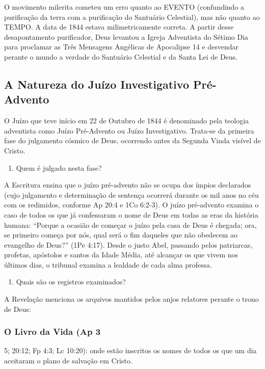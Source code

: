 \documentclass[11pt,a4paper,openany]{book}
\begin{document}
O movimento milerita cometeu um erro quanto ao EVENTO (confundindo a purificação da terra com a purificação do Santuário Celestial), mas não quanto ao TEMPO. A data de 1844 estava milimetricamente correta. A partir desse desapontamento purificador, Deus levantou a Igreja Adventista do Sétimo Dia para proclamar as Três Mensagens Angélicas de Apocalipse 14 e desvendar perante o mundo a verdade do Santuário Celestial e da Santa Lei de Deus.



\subsection{A Natureza do Juízo Investigativo Pré-Advento}


O Juízo que teve início em 22 de Outubro de 1844 é denominado pela teologia adventista como Juízo Pré-Advento ou Juízo Investigativo. Trata-se da primeira fase do julgamento cósmico de Deus, ocorrendo antes da Segunda Vinda visível de Cristo.

\begin{enumerate}
  \item Quem é julgado nesta fase?
\end{enumerate}

A Escritura ensina que o juízo pré-advento não se ocupa dos ímpios declarados (cujo julgamento e determinação de sentença ocorrerá durante os mil anos no céu com os redimidos, conforme Ap 20:4 e 1Co 6:2-3). O juízo pré-advento examina o caso de todos os que já confessaram o nome de Deus em todas as eras da história humana:
``Porque a ocasião de começar o juízo pela casa de Deus é chegada; ora, se primeiro começa por nós, qual será o fim daqueles que não obedecem ao evangelho de Deus?'' (1Pe 4:17).
Desde o justo Abel, passando pelos patriarcas, profetas, apóstolos e santos da Idade Média, até alcançar os que vivem nos últimos dias, o tribunal examina a lealdade de cada alma professa.

\begin{enumerate}
  \item Quais são os registros examinados?
\end{enumerate}

A Revelação menciona os arquivos mantidos pelos anjos relatores perante o trono de Deus:

\subsubsection*{O Livro da Vida (Ap 3}
5; 20:12; Fp 4:3; Lc 10:20): onde estão inscritos os nomes de todos os que um dia aceitaram o plano de salvação em Cristo.
\end{document}
